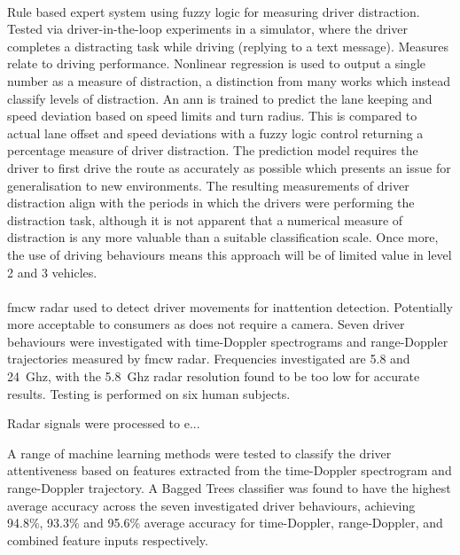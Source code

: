 \documentclass[11pt, parskip=half*,twoside=false]{scrbook}
\begin{document}
\paragraph{\citet{aksjonovDetectionEvaluationDriver2019}} Rule based expert system using fuzzy logic for measuring driver distraction. Tested via driver-in-the-loop experiments in a simulator, where the driver completes a distracting task while driving (replying to a text message). Measures relate to driving performance. Nonlinear regression is used to output a single number as a measure of distraction, a distinction from many works which instead classify levels of distraction. An \gls{ann} is trained to predict the lane keeping and speed deviation based on speed limits and turn radius. This is compared to actual lane offset and speed deviations with a fuzzy logic control returning a percentage measure of driver distraction. The prediction model requires the driver to first drive the route as accurately as possible which presents an issue for generalisation to new environments. The resulting measurements of driver distraction align with the periods in which the drivers were performing the distraction task, although it is not apparent that a numerical measure of distraction is any more valuable than a suitable classification scale. Once more, the use of driving behaviours means this approach will be of limited value in level 2 and 3 vehicles.

 \paragraph{\citet{dingInattentiveDrivingBehavior2019}} \gls{fmcw} radar used to detect driver movements for inattention detection. Potentially more acceptable to consumers as does not require a camera. Seven driver behaviours were investigated with time-Doppler spectrograms and range-Doppler trajectories measured by \gls{fmcw} radar. Frequencies investigated are 5.8 and 24~Ghz, with the 5.8~Ghz radar resolution found to be too low for accurate results. Testing is performed on six human subjects.
 
 Radar signals were processed to e...
 
 A range of machine learning methods were tested to classify the driver attentiveness based on features extracted from the time-Doppler spectrogram and range-Doppler trajectory. A Bagged Trees classifier was found to have the highest average accuracy across the seven investigated driver behaviours, achieving 94.8\%, 93.3\% and 95.6\% average accuracy for time-Doppler, range-Doppler, and combined feature inputs respectively. 
 
\end{document}
